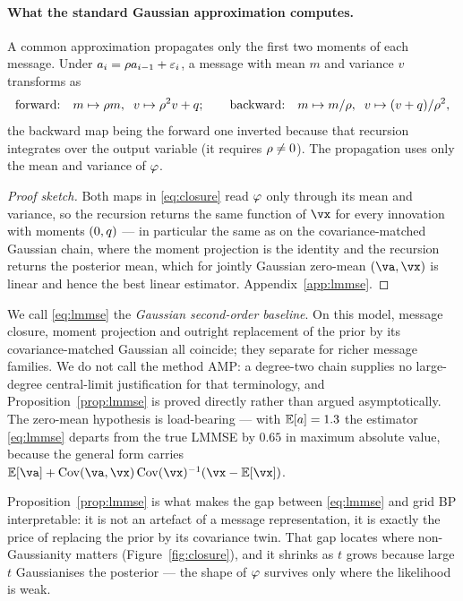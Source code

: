 \documentclass{article}
\begin{document}
\paragraph{What the standard Gaussian approximation computes.} A common approximation propagates
only the first two moments of each message. Under $a_i = \rho a_{i-1} + \varepsilon_i$, a message
with mean $m$ and variance $v$ transforms as
\begin{equation}
\label{eq:closure}
\text{forward:}\quad m \mapsto \rho m,\;\; v \mapsto \rho^2 v + q ;
\qquad
\text{backward:}\quad m \mapsto m/\rho,\;\; v \mapsto (v+q)/\rho^2 ,
\end{equation}
the backward map being the forward one inverted because that recursion integrates over the output
variable (it requires $\rho\neq0$). The propagation uses only the mean and variance of $\varphi$.



\begin{proof}[Proof sketch]
Both maps in \eqref{eq:closure} read $\varphi$ only through its mean and variance, so the recursion
returns the same function of $\vx$ for every innovation with moments $(0,q)$ --- in particular
the same as on the covariance-matched Gaussian chain, where the moment projection is the identity
and the recursion returns the posterior mean, which for jointly Gaussian zero-mean $(\va,\vx)$ is
linear and hence the best linear estimator. Appendix~\ref{app:lmmse}.
\end{proof}

We call \eqref{eq:lmmse} the \emph{Gaussian second-order baseline}. On this model, message
closure, moment projection and outright replacement of the prior by its covariance-matched
Gaussian all coincide; they separate for richer message families. We do not call the method AMP: a
degree-two chain supplies no large-degree central-limit justification for that terminology, and
Proposition~\ref{prop:lmmse} is proved directly rather than argued asymptotically. The zero-mean
hypothesis is load-bearing --- with $\mathbb{E}[a]=1.3$ the estimator \eqref{eq:lmmse} departs from the
true LMMSE by $0.65$ in maximum absolute value, because the general form carries
$\E[\va] + \Cov(\va,\vx)\Cov(\vx)^{-1}(\vx-\E[\vx])$.

Proposition~\ref{prop:lmmse} is what makes the gap between \eqref{eq:lmmse} and grid BP
interpretable: it is not an artefact of a message representation, it is exactly the price of
replacing the prior by its covariance twin. That gap locates where non-Gaussianity matters
(Figure~\ref{fig:closure}), and it shrinks as $t$ grows because large $t$ Gaussianises the
posterior --- the shape of $\varphi$ survives only where the likelihood is weak.
\end{document}

